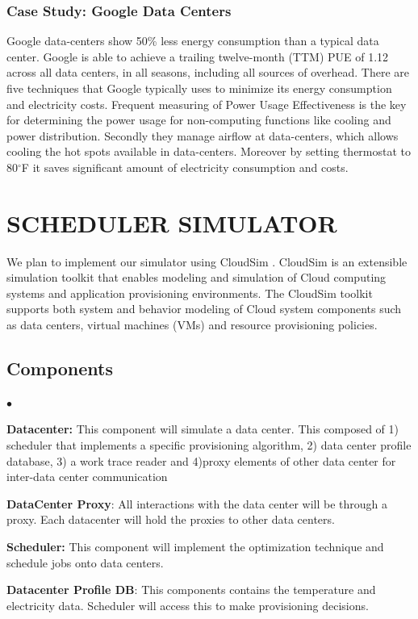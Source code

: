 \documentclass[letterpaper,twocolumn,10pt]{article}
\newenvironment{list2}{
  \begin{list}{$\bullet$}{%
      \setlength{\itemsep}{0in}
      \setlength{\parsep}{0in} \setlength{\parskip}{0in}
      \setlength{\topsep}{0in} \setlength{\partopsep}{0in}
      \setlength{\leftmargin}{0.2in}}}{\end{list}}
\begin{document}
\subsubsection{Case Study: Google Data Centers} \label{sec:CSgoogle}
Google data-centers show 50\% less energy consumption than a typical data center. Google is able to achieve a trailing twelve-month (TTM) PUE of 1.12 across all data centers, in all seasons, including all sources of overhead.
There are five techniques that Google typically uses to minimize its energy consumption and electricity costs. Frequent measuring of Power Usage Effectiveness is the key for determining the power usage for non-computing functions like cooling and power distribution. Secondly they manage airflow at data-centers, which allows cooling the hot spots available in data-centers. Moreover by setting thermostat to 80$^{\circ}$F it saves significant amount of electricity consumption and costs.



\section{SCHEDULER SIMULATOR} 
We plan to implement our simulator using CloudSim \cite{calheiros2011cloudsim}. CloudSim is an extensible simulation toolkit that enables modeling and simulation of Cloud computing systems and application provisioning environments. The CloudSim toolkit supports both system and behavior modeling of Cloud system components such as data centers, virtual machines (VMs) and resource provisioning policies.
\subsection{Components}
\begin{list2} %
\item \textbf{Datacenter:} This component will simulate a data center. This composed of 1) scheduler that implements a specific provisioning algorithm, 2) data center profile database, 3) a work trace reader and 4)proxy elements of other data center for inter-data center communication\
\item \textbf{DataCenter Proxy}: All interactions with the data center will be through a proxy. Each datacenter will hold the proxies to other data centers.\
\item \textbf{Scheduler:} This component will implement the optimization technique and schedule jobs onto data centers.\
\item \textbf{Datacenter Profile DB}: This components contains the temperature and electricity data. Scheduler will access this to make provisioning decisions.\
\end{list2}
\end{document}
